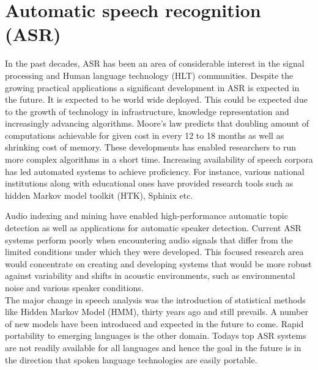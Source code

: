 \documentclass[11pt,a4paper,oneside,article]{memoir}
\begin{document}
\section{Automatic speech recognition (ASR)}
In the past decades, ASR has been an area of considerable interest in the signal processing and Human language technology (HLT) communities.\cite{baker} Despite the growing practical applications a significant development in ASR is expected in the future. It is expected to be world wide deployed. This could be expected due to the growth of technology in infrastructure, knowledge representation and increasingly advancing algorithms. Moore's law predicts that doubling amount of computations achievable for given cost in every 12 to 18 months as well as shrinking cost of memory. These developments has enabled researchers to run more complex algorithms in a short time. Increasing availability of speech corpora has led automated systems to achieve proficiency. For instance, various national institutions along with educational ones have provided research tools such as hidden Markov model toolkit (HTK), Sphinix etc.


Audio indexing and mining have enabled high-performance automatic topic detection as well as applications for automatic speaker detection. Current ASR systems perform poorly when encountering audio signals that differ from the limited conditions under which they were developed.
This focused research area would concentrate on creating and developing systems that would be more robust against variability and shifts in acoustic environments, such as environmental noise and various speaker conditions.\\
The major change in speech analysis was the introduction of statistical methods like Hidden Markov Model (HMM), thirty years ago and still prevails. A number of new models have been introduced and expected in the future to come.
Rapid portability to emerging languages is the other domain. Todays top ASR systems are not readily available for all languages and hence the goal in the future is in the direction that spoken language technologies are easily portable.
\end{document}
